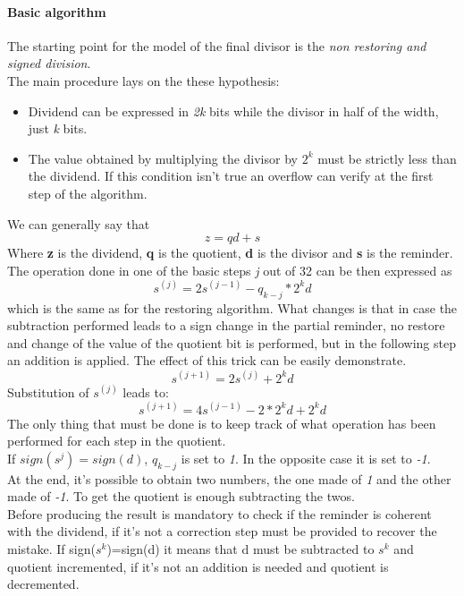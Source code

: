\paragraph{Basic algorithm}
The starting point for the model of the final divisor is the \textit{non restoring and signed division}.\\ 
The main procedure lays on the these hypothesis:
\begin{itemize}
    \item Dividend can be expressed in \textit{2k} bits while the divisor in half of the width, just \textit{k} bits.
    \item The value obtained by multiplying the divisor by $2^k$ must be strictly less than the dividend. If this condition isn't true an overflow can verify at the first step of the algorithm.
\end{itemize}
 We can generally say that
 \begin{equation}
     z=qd+s
 \end{equation}
 Where \textbf{z} is the dividend, \textbf{q} is the quotient, \textbf{d} is the divisor and \textbf{s} is the reminder.\\
 The operation done in one of the basic steps \textit{j} out of 32 can be then expressed as
 \begin{equation}
     s^{(j)}=2s^{(j-1)}-q_{k-j}*2^kd
 \end{equation}
which is the same as for the restoring algorithm. What changes is that in case the subtraction performed leads to a sign change in the partial reminder, no restore and change of the value of the quotient bit is performed, but in the following step an addition is applied.
The effect of this trick can be easily demonstrate.
\begin{equation}
     s^{(j+1)}=2s^{(j)}+2^kd
 \end{equation}
 Substitution of $s^{(j)}$ leads to:
 \begin{equation}
     s^{(j+1)}=4s^{(j-1)}-2*2^kd+2^kd
 \end{equation}
 The only thing that must be done is to keep track of what operation has been performed for each step in the quotient.\\
 If $sign(s^j)=sign(d)$, $q_{k-j}$ is set to \textit{1}. In the opposite case it is set to \textit{-1}. \\
 At the end, it's possible to obtain two numbers, the one made of \textit{1} and the other made of \textit{-1}. To get the quotient is enough subtracting the twos.\\
 Before producing the result is mandatory to check if the reminder is coherent with the dividend, if it's not a correction step must be provided to recover the mistake. If sign($s^k$)=sign(d) it means that d must be subtracted to $s^k$ and quotient incremented, if it's not 
an addition is needed and quotient is decremented.\\
